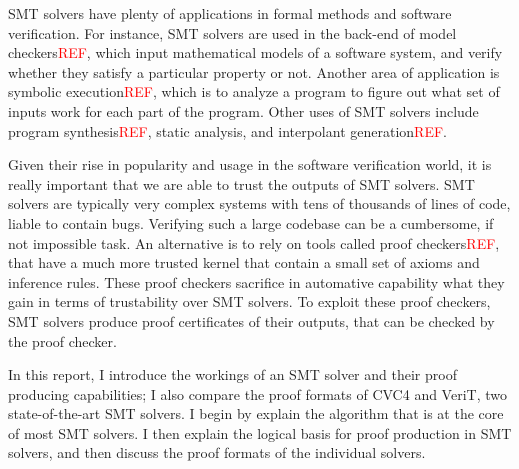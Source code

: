 \documentclass{article}
\begin{document}
SMT solvers have plenty of applications in formal methods 
and software verification. For instance, SMT solvers are used 
in the back-end of model checkers\textcolor{red}{REF}, which input mathematical 
models of a software system, and verify whether they 
satisfy a particular property or not. Another area of 
application is symbolic execution\textcolor{red}{REF}, which is to analyze a 
program to figure out what set of inputs work for each 
part of the program. Other uses of SMT solvers include 
program synthesis\textcolor{red}{REF}, static analysis, 
and interpolant generation\textcolor{red}{REF}.

Given their rise in popularity and usage in the software 
verification world, it is really important that we are able 
to trust the outputs of SMT solvers. SMT solvers are typically 
very complex systems with tens of thousands of lines of code, 
liable to contain bugs. Verifying such a large codebase can 
be a cumbersome, if not impossible task. An alternative is 
to rely on tools called proof checkers\textcolor{red}{REF}, 
that have a much more trusted kernel that contain a small 
set of axioms and inference rules. These proof checkers 
sacrifice in automative capability what they gain in terms 
of trustability over SMT solvers. To exploit these proof 
checkers, SMT solvers produce proof certificates of their 
outputs, that can be checked by the proof checker.

In this report, I introduce the workings of an SMT solver 
and their proof producing capabilities; I also compare the 
proof formats of CVC4 and VeriT, two state-of-the-art SMT solvers. I begin by explain the algorithm that is at the core 
of most SMT solvers. I then explain the logical basis for 
proof production in SMT solvers, and then discuss the proof 
formats of the individual solvers.
\end{document}
